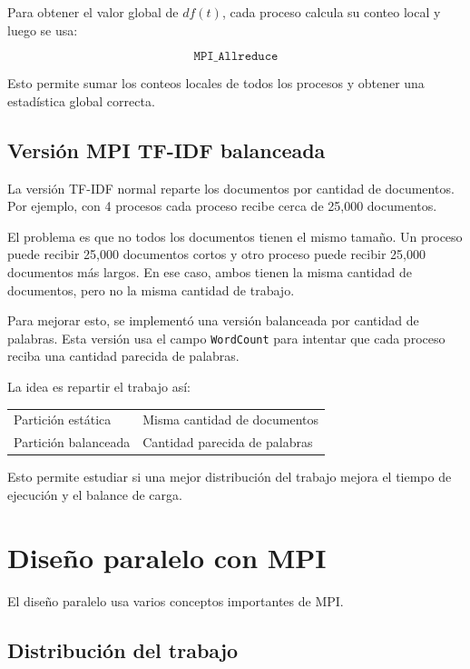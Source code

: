 \documentclass[12pt,letterpaper]{article}
\begin{document}
Para obtener el valor global de $df(t)$, cada proceso calcula su conteo local y luego se usa:

\[
\texttt{MPI\_Allreduce}
\]

Esto permite sumar los conteos locales de todos los procesos y obtener una estadística global correcta.

\subsection{Versión MPI TF-IDF balanceada}

La versión TF-IDF normal reparte los documentos por cantidad de documentos. Por ejemplo, con 4 procesos cada proceso recibe cerca de 25,000 documentos.

El problema es que no todos los documentos tienen el mismo tamaño. Un proceso puede recibir 25,000 documentos cortos y otro proceso puede recibir 25,000 documentos más largos. En ese caso, ambos tienen la misma cantidad de documentos, pero no la misma cantidad de trabajo.

Para mejorar esto, se implementó una versión balanceada por cantidad de palabras. Esta versión usa el campo \texttt{WordCount} para intentar que cada proceso reciba una cantidad parecida de palabras.

La idea es repartir el trabajo así:

\begin{center}
\begin{tabular}{ll}
\toprule
Partición estática & Misma cantidad de documentos \\
Partición balanceada & Cantidad parecida de palabras \\
\bottomrule
\end{tabular}
\end{center}

Esto permite estudiar si una mejor distribución del trabajo mejora el tiempo de ejecución y el balance de carga.

\section{Diseño paralelo con MPI}

El diseño paralelo usa varios conceptos importantes de MPI.

\subsection{Distribución del trabajo}
\end{document}
